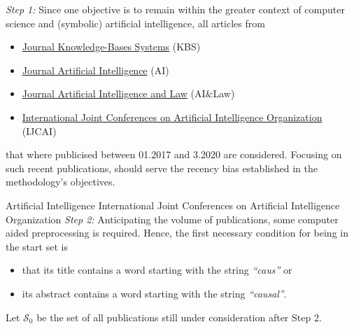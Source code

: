 \documentclass[11pt,a4paper]{book}
\theoremstyle{definition}
\theoremstyle{definition}
\theoremstyle{definition}
\theoremstyle{remark}
\newcommand{\tpsetz}{\mathcal{S}_{\mathit{0}}}
\begin{document}
\emph{Step 1:} Since one objective is to remain within the greater context of computer science and (symbolic) artificial intelligence, all articles from  
\begin{itemize}
\item \href{https://www.journals.elsevier.com/knowledge-based-systems}{Journal Knowledge-Bases Systems} (KBS)
\item \href{https://www.journals.elsevier.com/artificial-intelligence}{Journal Artificial Intelligence} (AI)
\item \href{https://www.springer.com/journal/10506}{Journal Artificial Intelligence and Law} (AI\&Law)
\item \href{https://www.ijcai.org/}{International Joint Conferences on Artificial Intelligence Organization} (IJCAI)
\end{itemize}
that where publicised between 01.2017 and 3.2020 are considered. Focusing on such recent publications, should serve the recency bias established in the methodology's objectives. 

\medskip

Artificial Intelligence International Joint Conferences on Artificial Intelligence Organization
\emph{Step 2:}  Anticipating the volume of publications, some computer aided preprocessing is required. Hence, the first necessary condition for being in the start set is 
\begin{itemize}
\item  that its title contains a word starting with the string \emph{``caus''} or 
\item  its abstract contains a word starting with the string \emph{``causal''}. 
\end{itemize}
Let $\tpsetz$ be the set of all publications still under consideration after Step 2.
\medskip
\end{document}
